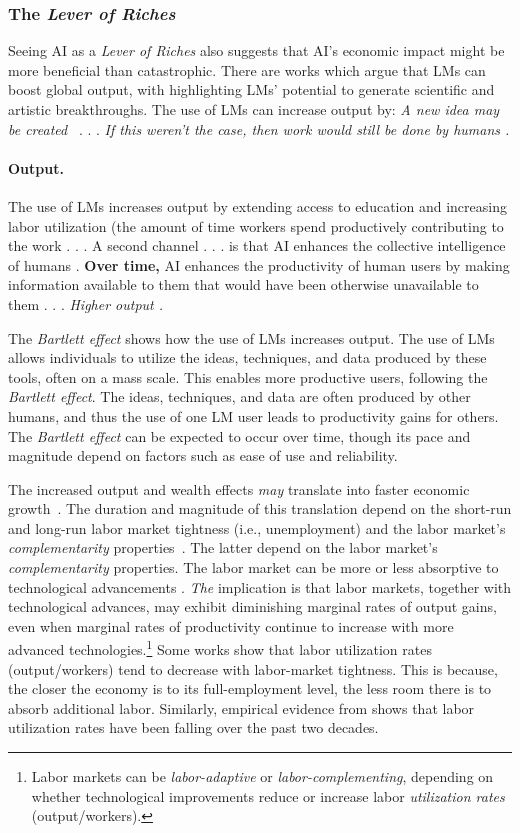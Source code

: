 \documentclass{article} %
\begin{document}
\subsubsection{The \emph{Lever of Riches}}

Seeing AI as a \emph{Lever of Riches} also suggests that AI's economic impact might be more beneficial than catastrophic.
There are works which argue that LMs can boost global output, with \citet{boiko2023emergent} highlighting LMs' potential to generate scientific and artistic breakthroughs.
The use of LMs can increase output by:    \emph{A new idea may be created}~\citep{boiko2023emergent} . . . \emph{If this weren't the case, then work would still be done by humans .}
\paragraph{Output.}
The use of LMs increases output by extending access to education and increasing labor utilization (the amount of time workers spend productively contributing to the work . . . A second channel . . . is that AI enhances the collective intelligence of humans . \textbf{Over time,} AI enhances the productivity of human users by making information available to them that would have been otherwise unavailable to them . . . \emph{Higher output .}

The \emph{Bartlett effect} shows how the use of LMs increases output.
The use of LMs allows individuals to utilize the ideas, techniques, and data produced by these tools, often on a mass scale.
This enables more productive users, following the \emph{Bartlett effect}.
The ideas, techniques, and data are often produced by other humans, and thus the use of one LM user leads to productivity gains for others.
The \emph{Bartlett effect} can be expected to occur over time, though its pace and magnitude depend on factors such as ease of use and reliability.

The increased output and wealth effects \emph{may} translate into faster economic growth~\citep{restrepo2023automation}.
The duration and magnitude of this translation depend on the short-run and long-run labor market tightness (i.e., unemployment) and the labor market's \emph{complementarity} properties~\citep{restrepo2023automation}.
The latter depend on the labor market's \emph{complementarity} properties.
The labor market can be more or less absorptive to technological advancements . \emph{The} implication is that labor markets, together with technological advances, may exhibit diminishing marginal rates of output gains, even when marginal rates of productivity continue to increase with more advanced technologies.\footnote{Labor markets can be \emph{labor-adaptive} or \emph{labor-complementing}, depending on whether technological improvements reduce or increase labor \emph{utilization rates} (output/workers).}
Some works show that labor utilization rates (output/workers) tend to decrease with labor-market tightness.
This is because, the closer the economy is to its full-employment level, the less room there is to absorb additional labor.
Similarly, empirical evidence from \citet{restrepo2023automation} shows that labor utilization rates have been falling over the past two decades.
\end{document}
